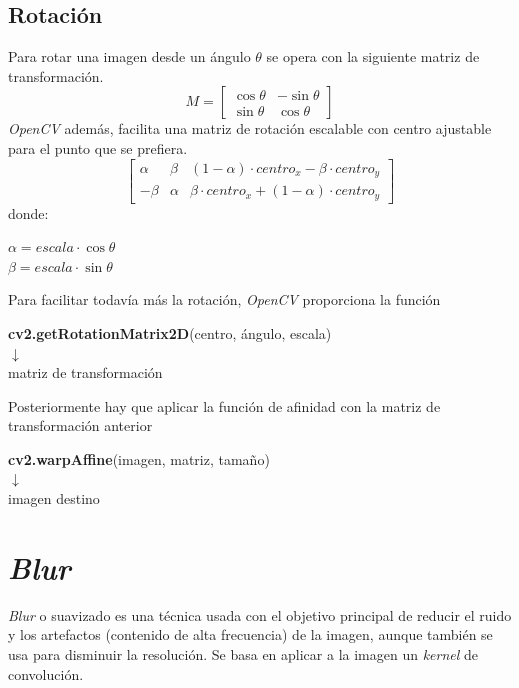 \subsection{Rotación}
Para rotar una imagen desde un ángulo $\theta$ se opera con la
siguiente matriz de transformación.
\begin{equation*}
  M =
  \begin{bmatrix}
    \cos \theta & -\sin \theta \\ \sin \theta & \cos \theta
  \end{bmatrix}
\end{equation*}
\emph{OpenCV} además, facilita una matriz de rotación escalable con
centro ajustable para el punto que se prefiera.
\begin{equation*}
  \begin{bmatrix}
    \alpha & \beta & (1 - \alpha) \cdot centro_x - \beta \cdot centro_y \\
    - \beta & \alpha & \beta \cdot centro_x + (1 - \alpha) \cdot
    centro_y
  \end{bmatrix}
\end{equation*}
donde:
\begin{center}
  $ \alpha = escala \cdot \cos \theta $
  \\
  $ \beta = escala \cdot \sin \theta $
\end{center}
Para facilitar todavía más la rotación, \emph{OpenCV} proporciona la
función
\begin{center}
  \textbf{cv2.getRotationMatrix2D}(centro, ángulo, escala) \\
  $\downarrow$ \\
  matriz de transformación
\end{center}
Posteriormente hay que aplicar la función de afinidad con la matriz de transformación anterior \\
\begin{center}
  \textbf{cv2.warpAffine}(imagen, matriz, tamaño)\\
  $\downarrow$ \\
  imagen destino
\end{center}

\section{\emph{Blur}}
\emph{Blur} o suavizado es una técnica usada con el objetivo principal
de reducir el ruido y los artefactos (contenido de alta frecuencia) de
la imagen, aunque también se usa para disminuir la resolución. Se basa
en aplicar a la imagen un \emph{kernel} de convolución.
